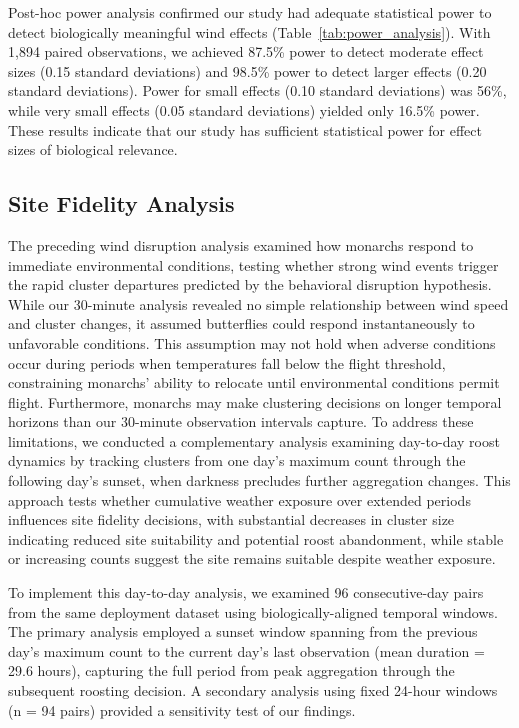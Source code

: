 Post-hoc power analysis confirmed our study had adequate statistical power to detect biologically meaningful wind effects (Table~\ref{tab:power_analysis}). With 1,894 paired observations, we achieved 87.5\% power to detect moderate effect sizes (0.15 standard deviations) and 98.5\% power to detect larger effects (0.20 standard deviations). Power for small effects (0.10 standard deviations) was 56\%, while very small effects (0.05 standard deviations) yielded only 16.5\% power. These results indicate that our study has sufficient statistical power for effect sizes of biological relevance.



\subsection{Site Fidelity Analysis}

The preceding wind disruption analysis examined how monarchs respond to immediate environmental conditions, testing whether strong wind events trigger the rapid cluster departures predicted by the behavioral disruption hypothesis. While our 30-minute analysis revealed no simple relationship between wind speed and cluster changes, it assumed butterflies could respond instantaneously to unfavorable conditions. This assumption may not hold when adverse conditions occur during periods when temperatures fall below the flight threshold, constraining monarchs' ability to relocate until environmental conditions permit flight. Furthermore, monarchs may make clustering decisions on longer temporal horizons than our 30-minute observation intervals capture. To address these limitations, we conducted a complementary analysis examining day-to-day roost dynamics by tracking clusters from one day's maximum count through the following day's sunset, when darkness precludes further aggregation changes. This approach tests whether cumulative weather exposure over extended periods influences site fidelity decisions, with substantial decreases in cluster size indicating reduced site suitability and potential roost abandonment, while stable or increasing counts suggest the site remains suitable despite weather exposure.

To implement this day-to-day analysis, we examined 96 consecutive-day pairs from the same deployment dataset using biologically-aligned temporal windows. The primary analysis employed a sunset window spanning from the previous day's maximum count to the current day's last observation (mean duration = 29.6 hours), capturing the full period from peak aggregation through the subsequent roosting decision. A secondary analysis using fixed 24-hour windows (n = 94 pairs) provided a sensitivity test of our findings.


